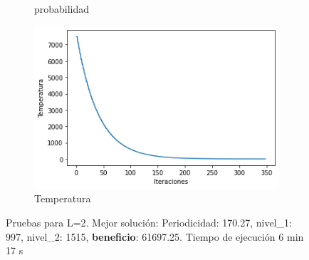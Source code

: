 \documentclass[a4paper,12pt]{article}
\begin{document}
\begin{figure}[H]
\begin{subfigure}{0.24\textwidth}
			\caption{probabilidad}
		\end{subfigure}
		\hfill
		\begin{subfigure}{0.24\textwidth}
			\centering
			\includegraphics[width=\textwidth]{include/L2/temperatura.png}
			\caption{Temperatura}
		\end{subfigure}
		\caption{Pruebas para L=2. Mejor solución: Periodicidad: 170.27, nivel\_1: 997,  nivel\_2: 1515, \textbf{beneficio}: 61697.25. Tiempo de ejecución 6 min 17 s}
	\end{figure}
\end{document}
